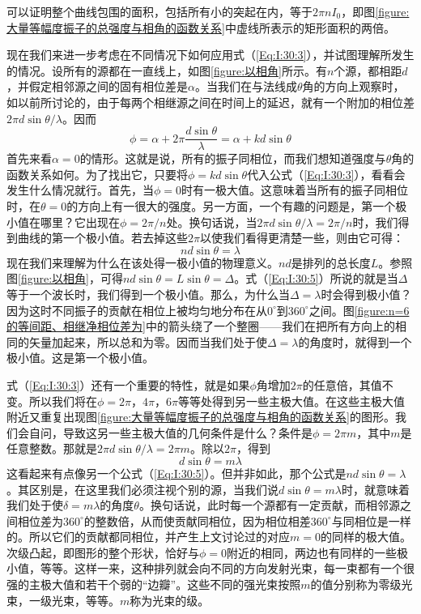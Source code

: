 可以证明整个曲线包围的面积，包括所有小的突起在内，等于$2\pi nI_0$，即图\ref{figure:大量等幅度振子的总强度与相角的函数关系}中虚线所表示的矩形面积的两倍。

现在我们来进一步考虑在不同情况下如何应用式（\ref{Eq:I:30:3}），并试图理解所发生的情况。设所有的源都在一直线上，如图\ref{figure:以相角}所示。有$n$个源，都相距$d$，并假定相邻源之间的固有相位差是$\alpha$。当我们在与法线成$\theta$角的方向上观察时，如以前所讨论的，由于每两个相继源之间在时间上的延迟，就有一个附加的相位差$2\pi d\sin\theta/\lambda$。因而
\begin{equation}
    \label{Eq:I:30:4}
    \phi = \alpha + 2\pi\frac{d\sin\theta}{\lambda} = \alpha + kd\sin\theta
\end{equation}
首先来看$\alpha=0$的情形。这就是说，所有的振子同相位，而我们想知道强度与$\theta$角的函数关系如何。为了找出它，只要将$\phi=kd\sin\theta$代入公式（\ref{Eq:I:30:3}），看看会发生什么情况就行。首先，当$\phi=0$时有一极大值。这意味着当所有的振子同相位时，在$\theta=0$的方向上有一很大的强度。另一方面，一个有趣的问题是，第一个极小值在哪里？它出现在$\phi=2\pi/n$处。换句话说，当$2\pi d\sin\theta/\lambda=2\pi/n$时，我们得到曲线的第一个极小值。若去掉这些$2\pi$以使我们看得更清楚一些，则由它可得：
\begin{equation}
    \label{Eq:I:30:5}
    nd\sin\theta=\lambda
\end{equation}
现在我们来理解为什么在该处得一极小值的物理意义。$nd$是排列的总长度$L$。参照图\ref{figure:以相角}，可得$nd\sin\theta=L\sin\theta=\Delta$。式（\ref{Eq:I:30:5}）所说的就是当$\Delta$等于一个波长时，我们得到一个极小值。那么，为什么当$\Delta=\lambda$时会得到极小值？因为这时不同振子的贡献在相位上被均匀地分布在从$0^\circ$到$360^\circ$之间。图\ref{figure:n=6的等间距、相继净相位差为}中的箭头绕了一个整圈——我们在把所有方向上的相同的矢量加起来，所以总和为零。因而当我们处于使$\Delta=\lambda$的角度时，就得到一个极小值。这是第一个极小值。

式（\ref{Eq:I:30:3}）还有一个重要的特性，就是如果$\phi$角增加$2\pi$的任意倍，其值不变。所以我们将在$\phi=2\pi$，$4\pi$，$6\pi$等等处得到另一些主极大值。在这些主极大值附近又重复出现图\ref{figure:大量等幅度振子的总强度与相角的函数关系}的图形。我们会自问，导致这另一些主极大值的几何条件是什么？条件是$\phi=2\pi m$，其中$m$是任意整数。那就是$2\pi d\sin\theta/\lambda=2\pi m$。除以$2\pi$，得到
\begin{equation}
    \label{Eq:I:30:6}
    d\sin\theta = m\lambda
\end{equation}
这看起来有点像另一个公式（\ref{Eq:I:30:5}）。但并非如此，那个公式是$nd\sin\theta=\lambda$。其区别是，在这里我们必须注视个别的源，当我们说$d\sin\theta=m\lambda$时，就意味着我们处于使$\delta=m\lambda$的角度$\theta$。换句话说，此时每一个源都有一定贡献，而相邻源之间相位差为$360^\circ$的整数倍，从而使贡献同相位，因为相位相差$360^\circ$与同相位是一样的。所以它们的贡献都同相位，并产生上文讨论过的对应$m=0$的同样的极大值。次级凸起，即图形的整个形状，恰好与$\phi=0$附近的相同，两边也有同样的一些极小值，等等。这样一来，这种排列就会向不同的方向发射光束，每一束都有一个很强的主极大值和若干个弱的“边瓣”。这些不同的强光束按照$m$的值分别称为零级光束，一级光束，等等。$m$称为光束的级。

